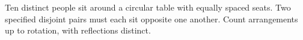 Ten distinct people sit around a circular table with equally spaced seats. Two specified disjoint pairs must each sit opposite one another. Count arrangements up to rotation, with reflections distinct.
